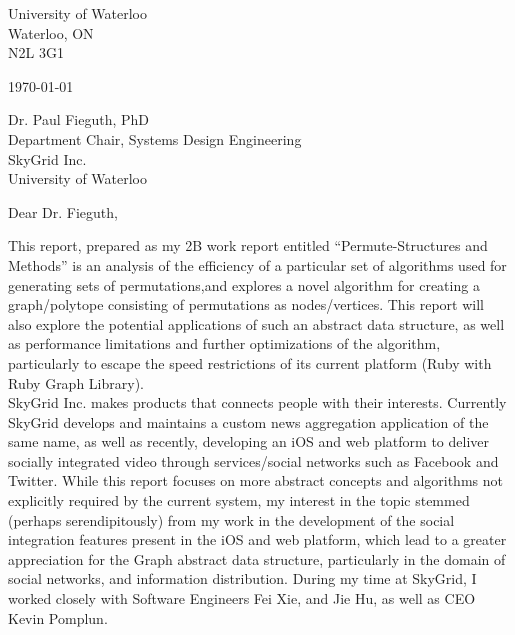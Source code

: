 \documentclass[12pt]{article}
\begin{document}



\begin{waterlooletter}
University of Waterloo\\
Waterloo, ON\\
N2L 3G1

\today

Dr. Paul Fieguth, PhD\\
Department Chair, Systems Design Engineering\\
SkyGrid Inc.\\
University of Waterloo

Dear Dr. Fieguth,

\indent This report, prepared as my 2B work report entitled ``Permute-Structures and Methods'' is an analysis of the efficiency of a particular set of algorithms used for generating sets of permutations,\linebreak[0] and explores a novel algorithm for creating a graph/polytope consisting of permutations as nodes/vertices.
This report will also explore the potential applications of such an abstract data structure, as well as performance limitations and further optimizations of the algorithm, particularly to escape the speed restrictions of its current platform (Ruby with Ruby Graph Library). \\

\indent SkyGrid Inc. makes products that connects people with their interests. Currently SkyGrid develops and maintains a custom news aggregation application of the same name, \linebreak[0] as well as recently, developing an iOS and web platform to deliver socially integrated video through services/social networks such as Facebook and Twitter.
While this report focuses on more abstract concepts and algorithms not explicitly required by the current system, my interest in the topic stemmed (perhaps serendipitously) from my work in the development of the social integration features present in the iOS and web platform, which lead to a greater appreciation for the Graph abstract data structure, particularly in the domain of social networks, and information distribution.
During my time at SkyGrid, I worked closely with Software Engineers Fei Xie, and Jie Hu, as well as CEO Kevin Pomplun.\\


\end{waterlooletter}
\end{document}
